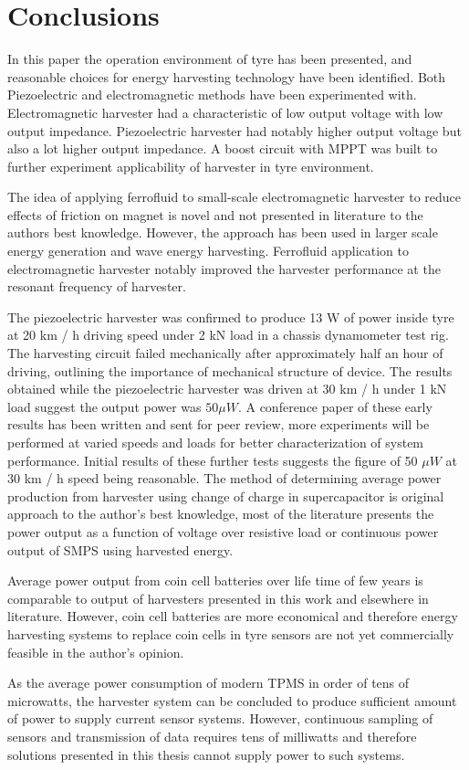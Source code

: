 \section{Conclusions}\label{sect:conclusions}
In this paper the operation environment of tyre has been presented, and reasonable choices for energy harvesting technology have been identified. Both Piezoelectric and electromagnetic methods have been experimented with. Electromagnetic harvester had a characteristic of low output voltage with low output impedance. Piezoelectric harvester had notably higher output voltage but also a lot higher output impedance. A boost circuit with MPPT was built to further experiment applicability of harvester in tyre environment. 

The idea of applying ferrofluid to small-scale electromagnetic harvester to reduce effects of friction on magnet is novel and not presented in literature to the authors best knowledge. However, the approach has been used in larger scale energy generation and wave energy harvesting. Ferrofluid application to electromagnetic harvester notably improved the harvester performance at the resonant frequency of harvester. 

The piezoelectric harvester was confirmed to produce 13 \mu W of power inside tyre at 20 km / h driving speed under 2 kN load in a chassis dynamometer test rig. The harvesting circuit failed mechanically after approximately half an hour of driving, outlining the importance of mechanical structure of device. The results obtained while the piezoelectric harvester was driven at 30 km / h under 1 kN load suggest the output power was $50 \mu W$. A conference paper of these early results has been written and sent for peer review, more experiments will be performed at varied speeds and loads for better characterization of system performance. Initial results of these further tests suggests the figure of 50 $\mu W$ at 30 km / h speed being reasonable. The method of determining average power production from harvester using change of charge in supercapacitor is original approach to the author's best knowledge, most of the literature presents the power output as a function of voltage over resistive load or continuous power output of SMPS using harvested energy.  

Average power output from coin cell batteries over life time of few years is comparable to output of harvesters presented in this work and elsewhere in literature. However, coin cell batteries are more economical and therefore energy harvesting systems to replace coin cells in tyre sensors are not yet commercially feasible in the author's opinion.

As the average power consumption of modern TPMS in order of tens of microwatts, the harvester system can be concluded to produce sufficient amount of power to supply current sensor systems. However, continuous sampling of sensors and transmission of data requires tens of milliwatts and therefore solutions presented in this thesis cannot supply power to such systems. 
